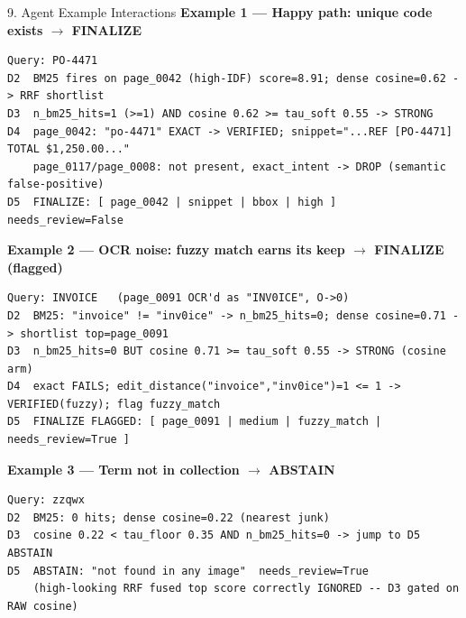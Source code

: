 \documentclass[10pt,aspectratio=169]{beamer}
\begin{document}
\begin{frame}[fragile]{9. Agent Example Interactions}
\textbf{Example 1 --- Happy path: unique code exists $\rightarrow$ FINALIZE}
\begin{lstlisting}[basicstyle=\ttfamily\tiny]
Query: PO-4471
D2  BM25 fires on page_0042 (high-IDF) score=8.91; dense cosine=0.62 -> RRF shortlist
D3  n_bm25_hits=1 (>=1) AND cosine 0.62 >= tau_soft 0.55 -> STRONG
D4  page_0042: "po-4471" EXACT -> VERIFIED; snippet="...REF [PO-4471] TOTAL $1,250.00..."
    page_0117/page_0008: not present, exact_intent -> DROP (semantic false-positive)
D5  FINALIZE: [ page_0042 | snippet | bbox | high ]   needs_review=False
\end{lstlisting}

\textbf{Example 2 --- OCR noise: fuzzy match earns its keep $\rightarrow$ FINALIZE (flagged)}
\begin{lstlisting}[basicstyle=\ttfamily\tiny]
Query: INVOICE   (page_0091 OCR'd as "INV0ICE", O->0)
D2  BM25: "invoice" != "inv0ice" -> n_bm25_hits=0; dense cosine=0.71 -> shortlist top=page_0091
D3  n_bm25_hits=0 BUT cosine 0.71 >= tau_soft 0.55 -> STRONG (cosine arm)
D4  exact FAILS; edit_distance("invoice","inv0ice")=1 <= 1 -> VERIFIED(fuzzy); flag fuzzy_match
D5  FINALIZE FLAGGED: [ page_0091 | medium | fuzzy_match | needs_review=True ]
\end{lstlisting}

\textbf{Example 3 --- Term not in collection $\rightarrow$ ABSTAIN}
\begin{lstlisting}[basicstyle=\ttfamily\tiny]
Query: zzqwx
D2  BM25: 0 hits; dense cosine=0.22 (nearest junk)
D3  cosine 0.22 < tau_floor 0.35 AND n_bm25_hits=0 -> jump to D5 ABSTAIN
D5  ABSTAIN: "not found in any image"  needs_review=True
    (high-looking RRF fused top score correctly IGNORED -- D3 gated on RAW cosine)
\end{lstlisting}
\end{frame}
\end{document}
